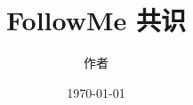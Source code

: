 \documentclass[dvipsnames]{ctexart}
\title{FollowMe 共识}
\date{\today}
\author{作者}
\newcommand{\mycola}{MidnightBlue}
\newcommand{\cola}[1]{\textcolor{\mycola}{#1}}
\begin{document}
\maketitle
\begin{comment}
\section{听一个共识}
让我们来想一个共识。优先要求这几点：
\begin{itemize}
\item 单节点可跑
\item 可（相对方便地）动态新增节点
\end{itemize}
\emoji{parrot} : 那么最简单的应该就是
\begin{myBox}{听一个共识 Listen-to-one Consensus}
  \label{cons-a}
  \begin{itemize}
  \item 第一个起的节点为Primary。
  \item 新增的节点往Primary上连接。
  \end{itemize}
\end{myBox}

\emoji{parrot} : 这个其实本质上就是在集群内部的一个 Server-Client 架构嘛。
也就是所有人都只听Primary的。
\begin{center}
  \begin{tikzpicture}
    \node[myNode,fill=\mycola,minimum height=4em] (a1) {primary};
    \foreach \d in {0,60,...,300}{
      \draw[latex-, very thick] (a1) -- (\d:3cm) node[myNode,fill=gray]{新增节点};
    }
  \end{tikzpicture}
\end{center}
这个的缺点就是\cola{主机down了，集群就down了}。它的优点就是新增的节点只需要和主
节点连接就行，而且非primary彼此不需要知道彼此。

\begin{tikzpicture}
  \emoji{parrot} 那么代码该怎么写呢？\\
  \emoji{turtle} 在写代码之前我们先定义共识所需要的接口吧。
\end{tikzpicture}

\end{comment}
\end{document}
